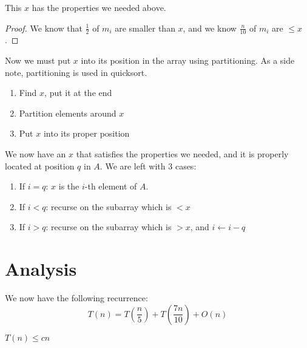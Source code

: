 \begin{claim}
This $x$ has the properties we needed above.
\end{claim}

\begin{proof}
We know that $\frac{1}{2}$ of $m_i$ are smaller than $x$, and we know $\frac{n}{10}$ of $m_i$ are $ \leq x $.
\end{proof}

Now we must put $x$ into its position in the array using partitioning.
As a side note, partitioning is used in quicksort.

\begin{enumerate}

\item Find $x$, put it at the end
\item Partition elements around $x$
\item Put $x$ into its proper position

\end{enumerate}

We now have an $x$ that satisfies the properties we needed, and it is
properly located at position $q$ in $A$.  We are left with 3 cases:

\begin{enumerate}

\item If $i = q$: $x$ is the $i$-th element of $A$.
\item If $i < q$: recurse on the subarray which is $ < x $

\item If $i > q$: recurse on the subarray which is $ > x $, and $ i
  \leftarrow i - q $

\end{enumerate}

\section{Analysis}

We now have the following recurrence:
%
\begin{displaymath}
T(n) = T \left( \frac{n}{5} \right) +T \left( \frac{7n}{10} \right) + O(n)
\end{displaymath}


\begin{claim}
$ T(n) \leq cn $
\end{claim}

